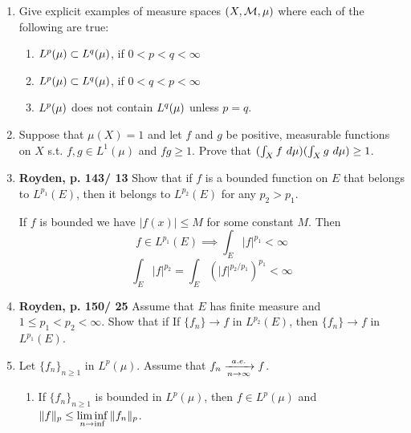 \documentclass[12pt]{article}
\begin{document}
\begin{enumerate}
\item Give explicit examples of measure spaces $(X, \mathcal{M}, \mu)$ where each of the following are true:
\begin{enumerate}
\item $L^p(\mu) \subset L^q(\mu)$, if $0 < p < q< \infty$
\begin{mybox}

\end{mybox}
\item $L^p(\mu) \subset L^q(\mu)$, if $0 < q < p < \infty$
\begin{mybox}

\end{mybox}
\item $L^p(\mu)$ does not contain $L^q(\mu)$ unless $p=q$.
\begin{mybox}

\end{mybox}

\end{enumerate}

\item Suppose that $\mu(X) =1$ and let $f$ and $g$ be positive, measurable functions on $X$ s.t. $f, g\in L^1(\mu)$  and $fg \geq 1$. Prove that $(\int_X f \ d\mu)( \int_X g \ d\mu) \geq 1$.
\begin{mybox}

\end{mybox}


\item \textbf{Royden, p. 143/ 13}
    Show that if $f$ is a bounded function on $E$ that belongs to $L^{p_1}(E)$,
    then it belongs to $L^{p_2} (E)$ for any $p_2 > p_1$.
    \begin{mybox}
        If $f$ is bounded we have $|f(x)|\leq M$ for some
        constant $M$. Then
        $$f\in L^{p_1}(E)\implies\int_E{|f|^{p_1}}<\infty$$
        $$\int_E{|f|^{p_2}}=\int_E{\left(|f|^{p_2/p_1}\right)^{p_1}}<\infty$$
    \end{mybox}

\item \textbf{Royden, p. 150/ 25}
    Assume that $E$ has finite measure and $1 \leq p_1 < p_2 < \infty$. Show that if If $\{f_n\}\to f$
    in $L^{p_2} (E)$, then $\{f_n\} \to f$ in $L^{p_1} (E)$.
\begin{mybox}

\end{mybox}

\item Let $\{f_n\}_{n \geq 1}$ in $L^p(\mu)$. Assume that $\displaystyle f_n \xrightarrow[n \to \infty]{a.e.} f$. 
\begin{enumerate}
\item If $\{f_n\}_{n \geq 1}$ is bounded in $L^p(\mu)$, then $f \in L^p(\mu)$ and $\displaystyle \|f\|_p \leq \liminf_{n \to \inf} \|f_n\|_p$.
\begin{mybox}


\end{mybox}
\end{enumerate}
\end{enumerate}
\end{document}
